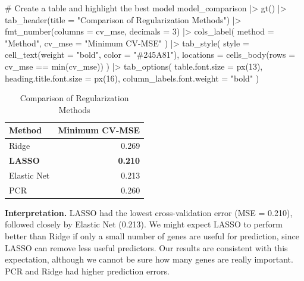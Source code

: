 \documentclass[
  letterpaper,
  DIV=11,
  numbers=noendperiod]{scrreprt}
\newenvironment{Shaded}{\begin{snugshade}}{\end{snugshade}}
\newcommand{\AttributeTok}[1]{\textcolor[rgb]{0.40,0.45,0.13}{#1}}
\newcommand{\CommentTok}[1]{\textcolor[rgb]{0.37,0.37,0.37}{#1}}
\newcommand{\DecValTok}[1]{\textcolor[rgb]{0.68,0.00,0.00}{#1}}
\newcommand{\FunctionTok}[1]{\textcolor[rgb]{0.28,0.35,0.67}{#1}}
\newcommand{\NormalTok}[1]{\textcolor[rgb]{0.00,0.23,0.31}{#1}}
\newcommand{\SpecialCharTok}[1]{\textcolor[rgb]{0.37,0.37,0.37}{#1}}
\newcommand{\StringTok}[1]{\textcolor[rgb]{0.13,0.47,0.30}{#1}}
\begin{document}
\begin{Shaded}
\begin{Highlighting}[]
\CommentTok{\# Create a table and highlight the best model}
\NormalTok{model\_comparison }\SpecialCharTok{|\textgreater{}}
  \FunctionTok{gt}\NormalTok{() }\SpecialCharTok{|\textgreater{}}
  \FunctionTok{tab\_header}\NormalTok{(}\AttributeTok{title =} \StringTok{"Comparison of Regularization Methods"}\NormalTok{) }\SpecialCharTok{|\textgreater{}}
  \FunctionTok{fmt\_number}\NormalTok{(}\AttributeTok{columns =}\NormalTok{ cv\_mse, }\AttributeTok{decimals =} \DecValTok{3}\NormalTok{) }\SpecialCharTok{|\textgreater{}}
  \FunctionTok{cols\_label}\NormalTok{(}
    \AttributeTok{method =} \StringTok{"Method"}\NormalTok{,}
    \AttributeTok{cv\_mse =} \StringTok{"Minimum CV{-}MSE"}
\NormalTok{  ) }\SpecialCharTok{|\textgreater{}}
  \FunctionTok{tab\_style}\NormalTok{(}
    \AttributeTok{style =} \FunctionTok{cell\_text}\NormalTok{(}\AttributeTok{weight =} \StringTok{"bold"}\NormalTok{, }\AttributeTok{color =} \StringTok{"\#245A81"}\NormalTok{),}
    \AttributeTok{locations =} \FunctionTok{cells\_body}\NormalTok{(}\AttributeTok{rows =}\NormalTok{ cv\_mse }\SpecialCharTok{==} \FunctionTok{min}\NormalTok{(cv\_mse))}
\NormalTok{  ) }\SpecialCharTok{|\textgreater{}}
  \FunctionTok{tab\_options}\NormalTok{(}
    \AttributeTok{table.font.size =} \FunctionTok{px}\NormalTok{(}\DecValTok{13}\NormalTok{),}
    \AttributeTok{heading.title.font.size =} \FunctionTok{px}\NormalTok{(}\DecValTok{16}\NormalTok{),}
    \AttributeTok{column\_labels.font.weight =} \StringTok{"bold"}
\NormalTok{  )}
\end{Highlighting}
\end{Shaded}

\begin{table}
\caption*{
{\fontsize{12}{15}\selectfont  Comparison of Regularization Methods\fontsize{10}{12}\selectfont }
} 
\fontsize{10.0pt}{12.0pt}\selectfont
\begin{tabular*}{\linewidth}{@{\extracolsep{\fill}}lr}
\toprule
Method & Minimum CV-MSE \\ 
\midrule\addlinespace[2.5pt]
Ridge & 0.269 \\ 
{\bfseries \textcolor[HTML]{245A81}{LASSO}} & {\bfseries \textcolor[HTML]{245A81}{0.210}} \\ 
Elastic Net & 0.213 \\ 
PCR & 0.260 \\ 
\bottomrule
\end{tabular*}
\end{table}

\textbf{Interpretation.} LASSO had the lowest cross-validation error
(MSE = 0.210), followed closely by Elastic Net (0.213). We might expect
LASSO to perform better than Ridge if only a small number of genes are
useful for prediction, since LASSO can remove less useful predictors.
Our results are consistent with this expectation, although we cannot be
sure how many genes are really important. PCR and Ridge had higher
prediction errors.
\end{document}
